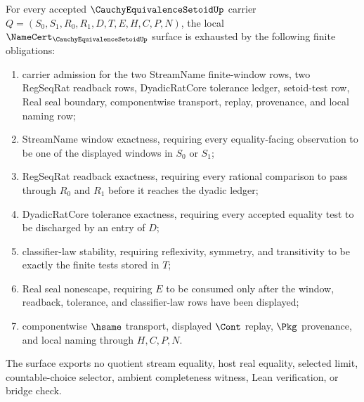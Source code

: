\begin{theorem}
\label{thm:cauchy-equivalence-setoid-namecert-surface}
For every accepted $\CauchyEquivalenceSetoidUp$ carrier $Q=(S_0,S_1,R_0,R_1,D,T,E,H,C,P,N)$, the local $\NameCert_{\CauchyEquivalenceSetoidUp}$ surface is exhausted by the following finite obligations:
\begin{enumerate}
\item carrier admission for the two StreamName finite-window rows, two RegSeqRat readback rows, DyadicRatCore tolerance ledger, setoid-test row, Real seal boundary, componentwise transport, replay, provenance, and local naming row;
\item StreamName window exactness, requiring every equality-facing observation to be one of the displayed windows in $S_0$ or $S_1$;
\item RegSeqRat readback exactness, requiring every rational comparison to pass through $R_0$ and $R_1$ before it reaches the dyadic ledger;
\item DyadicRatCore tolerance exactness, requiring every accepted equality test to be discharged by an entry of $D$;
\item classifier-law stability, requiring reflexivity, symmetry, and transitivity to be exactly the finite tests stored in $T$;
\item Real seal nonescape, requiring $E$ to be consumed only after the window, readback, tolerance, and classifier-law rows have been displayed;
\item componentwise $\hsame$ transport, displayed $\Cont$ replay, $\Pkg$ provenance, and local naming through $H,C,P,N$.
\end{enumerate}
The surface exports no quotient stream equality, host real equality, selected limit, countable-choice selector, ambient completeness witness, Lean verification, or bridge check.
\end{theorem}
